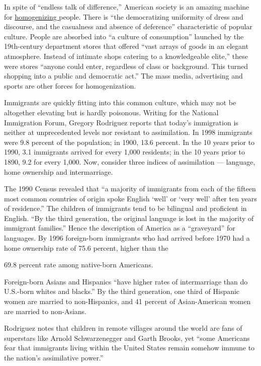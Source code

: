 \documentclass[UTF8,11pt]{ctexart}
\begin{document}
In spite of “endless talk of difference,” American society is an amazing machine for \uline{homogenizing }people. There is “the democratizing uniformity of dress and discourse, and the casualness and absence of deference” characteristic of popular culture. People are absorbed into “a culture of consumption” launched by the 19th-century department stores that offered “vast arrays of goods in an elegant atmosphere. Instead of intimate shops catering to a knowledgeable elite,” these were stores “anyone could enter, regardless of class or background. This turned shopping into a public and democratic act.” The mass media, advertising and sports are other forces for homogenization.


Immigrants are quickly fitting into this common culture, which may not be altogether elevating but is hardly poisonous. Writing for the National Immigration Forum, Gregory Rodriguez reports that today’s immigration is neither at unprecedented levels nor resistant to assimilation. In 1998 immigrants were 9.8 percent of the population; in 1900, 13.6 percent. In the 10 years prior to 1990, 3.1 immigrants arrived for every 1,000 residents; in the 10 years prior to 1890, 9.2 for every 1,000. Now, consider three indices of assimilation — language, home ownership and intermarriage.


The 1990 Census revealed that “a majority of immigrants from each of the fifteen most common countries of origin spoke English ‘well’ or ‘very well’ after ten years of residence.” The children of immigrants tend to be bilingual and proficient in English. “By the third generation, the original language is lost in the majority of immigrant families.” Hence the description of America as a “graveyard” for languages. By 1996 foreign-born immigrants who had arrived before 1970 had a home ownership rate of 75.6 percent, higher than the


69.8 percent rate among native-born Americans.


Foreign-born Asians and Hispanics “have higher rates of intermarriage than do U.S.-born whites and blacks.” By the third generation, one third of Hispanic women are married to non-Hispanics, and 41 percent of Asian-American women are married to non-Asians.


Rodriguez notes that children in remote villages around the world are fans of superstars like Arnold Schwarzenegger and Garth Brooks, yet “some Americans fear that immigrants living within the United States remain somehow immune to the nation’s assimilative power.”
\end{document}
